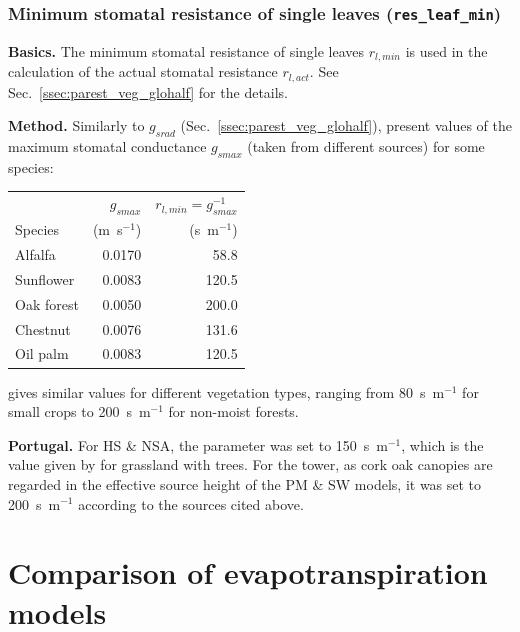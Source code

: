 \documentclass{scrreprt}
\begin{document}
\newpage
\subsection{Minimum stomatal resistance of single leaves (\texttt{res\_leaf\_min})} \label{ssec:parest_veg_resleafmin}

\textbf{Basics.}
The minimum stomatal resistance of single leaves $r_{l,min}$ is used in the calculation of the actual stomatal resistance $r_{l,act}$.
See Sec.~\ref{ssec:parest_veg_glohalf} for the details.

\noindent
\textbf{Method.}
Similarly to $g_{srad}$ (Sec.~\ref{ssec:parest_veg_glohalf}), \citet{saugier91} present values of the maximum stomatal conductance $g_{smax}$ (taken from different sources) for some species:
%
\begin{table}[H]
  \centering
  \begin{tabular}{lrr}
               & $g_{smax}$    & $r_{l,min} = g_{smax}^{-1}$ \\
    Species    & (m~s$^{-1}$) & (s~m$^{-1}$) \\
    \hline
    Alfalfa    & 0.0170      & 58.8 \\
    Sunflower  & 0.0083      & 120.5 \\
    Oak forest & 0.0050      & 200.0 \\
    Chestnut   & 0.0076      & 131.6 \\
    Oil palm   & 0.0083      & 120.5
  \end{tabular}
  \label{tab:res_leaf_min}
\end{table}
\noindent
\citet{guentner02} gives similar values for different vegetation types, ranging from 80~s~m$^{-1}$ for small crops to 200~s~m$^{-1}$ for non-moist forests.

\noindent
\textbf{Portugal.}
For HS \& NSA, the parameter was set to 150~s~m$^{-1}$, which is the value given by \citet{guentner02} for grassland with trees.
For the tower, as cork oak canopies are regarded in the effective source height of the PM \& SW models, it was set to 200~s~m$^{-1}$ according to the sources cited above.


\chapter{Comparison of evapotranspiration models} \label{ch:modelcomp}

\end{document}
